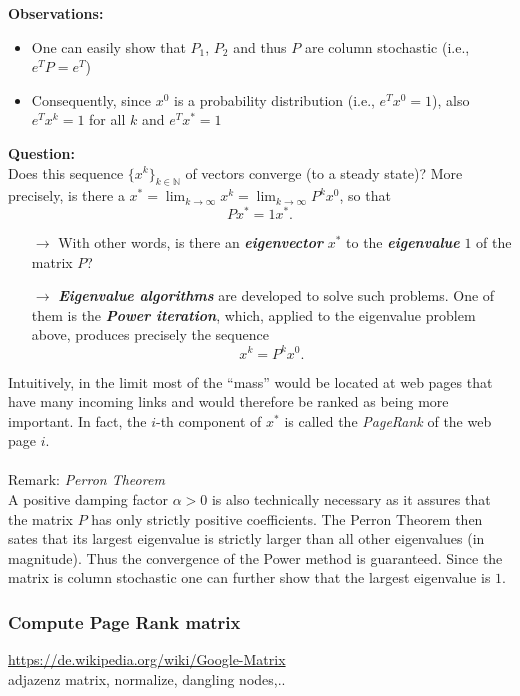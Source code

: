\textbf{Observations:}
\begin{itemize}
	\item One can easily show that $P_1$, $P_2$ and thus $P$ are column stochastic (i.e., $e^TP = e^T$)
	\item Consequently, since $x^0$ is a probability distribution (i.e., $e^Tx^0 = 1$), also $e^Tx^k = 1$ for all $k$ and $e^Tx^*=1$
\end{itemize}

\textbf{Question:} \\
Does this sequence $\{x^k\}_{k \in \mathbb{N}}$ of vectors converge (to a steady state)? More precisely, is there a $x^* = \lim_{k\to \infty} x^k= \lim_{k\to \infty} P^kx^0$, so that
\begin{equation} \label{eq:PageRank_eigprob}
Px^* = 1 x^* .
\end{equation}
\begin{itemize}
	\item[$\rightarrow$] With other words, is there an \textit{\textbf{eigenvector}} $x^*$ to the \textit{\textbf{eigenvalue}} $1$ of the matrix $P$?
	\item[$\rightarrow$]\textit{\textbf{Eigenvalue algorithms}} are developed to solve such problems. One of them is the \textit{\textbf{Power iteration}}, which, applied to the eigenvalue problem above, produces precisely the sequence
	$$x^k = P^k x^0.$$
\end{itemize}
Intuitively, in the limit most of the ``mass'' would be located at web pages that have many incoming links and would therefore be ranked as being more important. In fact, the $i$-th component of $x^*$ is called the \textit{PageRank} of the web page $i$.\\~\\
Remark: \textit{Perron Theorem}\\
A positive damping factor $\alpha>0$ is also technically necessary as it assures that the matrix $P$ has only strictly positive coefficients. The Perron Theorem then sates that its largest eigenvalue is strictly larger than all other eigenvalues (in magnitude). Thus the convergence of the Power method is guaranteed. Since the matrix is column stochastic one can further show that the largest eigenvalue is $1$.

\subsubsection{Compute Page Rank matrix}
\url{https://de.wikipedia.org/wiki/Google-Matrix}\\
adjazenz matrix, normalize, dangling nodes,..

